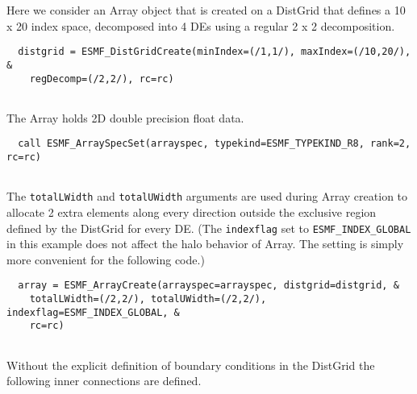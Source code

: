    Here we consider an Array object that is created on a DistGrid that 
   defines a 10 x 20 index space, decomposed into 4 DEs using a regular
   2 x 2 decomposition. 

 \begin{verbatim}
  distgrid = ESMF_DistGridCreate(minIndex=(/1,1/), maxIndex=(/10,20/), &
    regDecomp=(/2,2/), rc=rc)
 
\end{verbatim}
 

   The Array holds 2D double precision float data. 

 \begin{verbatim}
  call ESMF_ArraySpecSet(arrayspec, typekind=ESMF_TYPEKIND_R8, rank=2, rc=rc)
 
\end{verbatim}
 

   The {\tt totalLWidth} and {\tt totalUWidth} arguments are used during Array
   creation to allocate 2 extra elements along every direction outside the 
   exclusive region defined by the DistGrid for every DE. (The {\tt indexflag}
   set to {\tt ESMF\_INDEX\_GLOBAL} in this example does not affect the halo
   behavior of Array. The setting is simply more convenient for the following
   code.) 

 \begin{verbatim}
  array = ESMF_ArrayCreate(arrayspec=arrayspec, distgrid=distgrid, &
    totalLWidth=(/2,2/), totalUWidth=(/2,2/), indexflag=ESMF_INDEX_GLOBAL, &
    rc=rc)
 
\end{verbatim}
 

   Without the explicit definition of boundary conditions in the DistGrid
   the following inner connections are defined.
  

